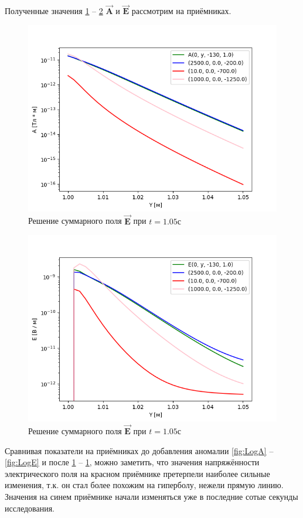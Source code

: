 Полученные значения \ref{fig:A_Log_added} -- \ref{fig:E_Log_added} $\overrightarrow{\textbf{A}}$ и $\overrightarrow{\textbf{E}}$ рассмотрим на приёмниках.

\begin{figure}
	\centering
	\includegraphics[width=0.8\linewidth]{images/Log_A_obj1.png}
	\caption{Решение суммарного поля $\overrightarrow{\textbf{E}}$ при $t = 1.05с$}
	\label{fig:A_Log_added}
\end{figure} 


\begin{figure}
	\centering
	\includegraphics[width=0.8\linewidth]{images/Log_E_obj1.png}
	\caption{Решение суммарного поля $\overrightarrow{\textbf{E}}$ при $t = 1.05с$}
	\label{fig:E_Log_added}
\end{figure} 

Сравнивая показатели на приёмниках до добавления аномалии \ref{fig:LogA} -- \ref{fig:LogE} и после \ref{fig:A_Log_added} -- \ref{fig:A_Log_added}, можно заметить, что значения напряжённости электрического поля на красном приёмнике претерпели наиболее сильные изменения, т.к. он стал более похожим на гиперболу, нежели прямую линию. Значения на синем приёмнике начали изменяться уже в последние сотые секунды исследования. 

